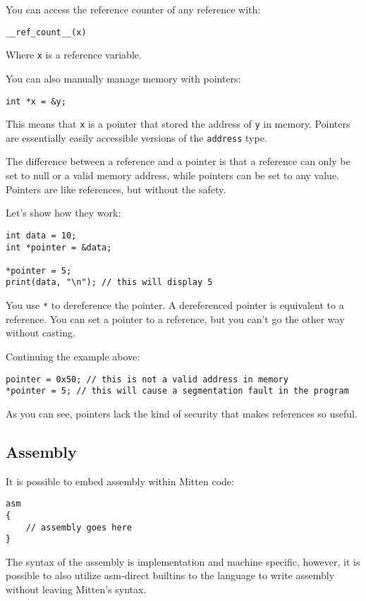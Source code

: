 \documentclass[10pt,a4paper]{article}
\begin{document}
You can access the reference counter of any reference with:
\begin{verbatim}
__ref_count__(x)
\end{verbatim}

Where \verb|x| is a reference variable.

You can also manually manage memory with pointers:
\begin{verbatim}
int *x = &y;
\end{verbatim}

This means that \verb|x| is a pointer that stored the address of \verb|y| in memory. Pointers are essentially easily accessible versions of the \verb|address| type.

The difference between a reference and a pointer is that a reference can only be set to null or a valid memory address, while pointers can be set to any value. Pointers are like references, but without the safety.

Let's show how they work:
\begin{verbatim}
int data = 10;
int *pointer = &data;

*pointer = 5;
print(data, "\n"); // this will display 5
\end{verbatim}

You use \verb|*| to dereference the pointer. A dereferenced pointer is equivalent to a reference. You can set a pointer to a reference, but you can't go the other way without casting.

Continuing the example above:
\begin{verbatim}
pointer = 0x50; // this is not a valid address in memory
*pointer = 5; // this will cause a segmentation fault in the program
\end{verbatim}

As you can see, pointers lack the kind of security that makes references so useful.

\newpage




\subsection{Assembly}
It is possible to embed assembly within Mitten code:
\begin{verbatim}
asm
{
    // assembly goes here
}
\end{verbatim}

The syntax of the assembly is implementation and machine specific, however, it is possible to also utilize asm-direct builtins to the language to write assembly without leaving Mitten's syntax.
\end{document}

